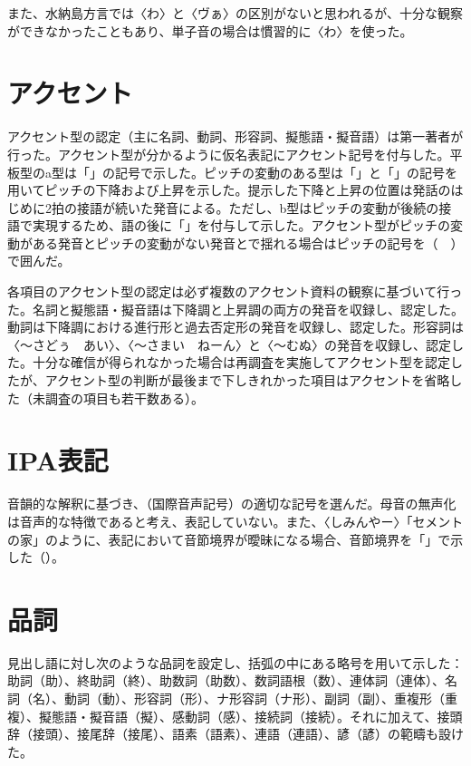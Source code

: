 また、水納島方言では〈わ〉と〈ヴぁ〉の区別がないと思われるが、十分な観察ができなかったこともあり、単子音の場合は慣習的に〈わ〉を使った。

\section{アクセント}

アクセント型の認定（主に名詞、動詞、形容詞、擬態語・擬音語）は第一著者が行った。アクセント型が分かるように仮名表記にアクセント記号を付与した。平板型のa型は「\heiban{}」の記号で示した。ピッチの変動のある型は「\kako{}」と「\josho{}」の記号を用いてピッチの下降および上昇を示した。提示した下降と上昇の位置は発話のはじめに2拍の接語が続いた発音による。ただし、b型はピッチの変動が後続の接語で実現するため、語の後に「\kako{}」を付与して示した。アクセント型がピッチの変動がある発音とピッチの変動がない発音とで揺れる場合はピッチの記号を（　）で囲んだ。

各項目のアクセント型の認定は必ず複数のアクセント資料の観察に基づいて行った。名詞と擬態語・擬音語は下降調と上昇調の両方の発音を収録し、認定した。動詞は下降調における進行形と過去否定形の発音を収録し、認定した。形容詞は〈～さどぅ　あい〉、〈～さまい　ねーん〉と〈～むぬ〉の発音を収録し、認定した。十分な確信が得られなかった場合は再調査を実施してアクセント型を認定したが、アクセント型の判断が最後まで下しきれかった項目はアクセントを省略した（未調査の項目も若干数ある）。

\section{IPA表記}

音韻的な解釈に基づき、（国際音声記号）の適切な記号を選んだ。母音の無声化は音声的な特徴であると考え、表記していない。また、〈しみんやー〉\ip{[ɕiminjaː]}「セメントの家」のように、表記において音節境界が曖昧になる場合、音節境界を「」で示した（）。

\section{品詞}

見出し語に対し次のような品詞を設定し、括弧の中にある略号を用いて示した：助詞（助）、終助詞（終）、助数詞（助数）、数詞語根（数）、連体詞（連体）、名詞（名）、動詞（動）、形容詞（形）、ナ形容詞（ナ形）、副詞（副）、重複形（重複）、擬態語・擬音語（擬）、感動詞（感）、接続詞（接続）。それに加えて、接頭辞（接頭）、接尾辞（接尾）、語素（語素）、連語（連語）、諺（諺）の範疇も設けた。

